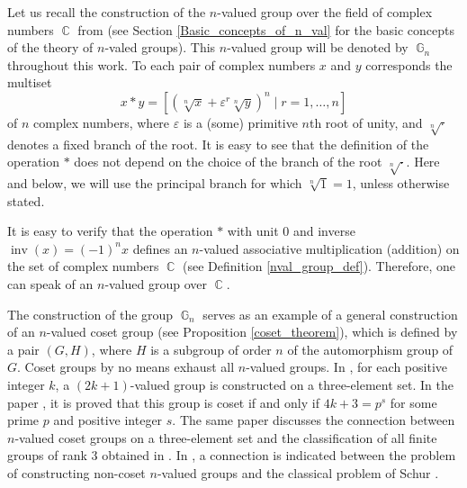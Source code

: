 \documentclass[14pt, dvipsnames]{extarticle}
\theoremstyle{definition}
\theoremstyle{definition}
\theoremstyle{remark}
\DeclareMathOperator{\G}{\mathbb{G}}
\DeclareMathOperator{\inv}{\mathrm{inv}}
\DeclareMathOperator{\Cc}{\mathbb{C}}
\renewcommand{\epsilon}{\varepsilon}
\begin{document}
Let us recall the construction of the $n$-valued group over the field of complex numbers $\Cc$ from \cite{Buchstaber_Novikov} (see Section \ref{Basic_concepts_of_n_val} for the basic concepts of the theory of $n$-valed groups). This $n$-valued group will be denoted by $\G_n$ throughout this work. To each pair of complex numbers $x$ and $y$ corresponds the multiset
\begin{equation}\label{operation}
x\ast y = [(\sqrt[n]{x} + \epsilon^r\sqrt[n]{y})^n\mid r = 1, \dots, n]
\end{equation}
of $n$ complex numbers, where $\epsilon$ is a (some) primitive $n$th root of unity, and $\sqrt[n]{\cdot}$ denotes a fixed branch of the root. It is easy to see that the definition of the operation $\ast$ does not depend on the choice of the branch of the root $\sqrt[n]{\cdot}$. Here and below, we will use the principal branch for which $\sqrt[n]{1} = 1$, unless otherwise stated.

It is easy to verify that the operation $\ast$ with unit $0$ and inverse $\inv(x) = (-1)^nx$ defines an $n$-valued associative multiplication (addition) on the set of complex numbers $\Cc$ (see Definition \ref{nval_group_def}). Therefore, one can speak of an $n$-valued group over $\Cc$.

The construction of the group $\G_n$ serves as an example of a general construction of an $n$-valued coset group (see Proposition \ref{coset_theorem}), which is defined by a pair $(G, H)$, where $H$ is a subgroup of order $n$ of the automorphism group of $G$. Coset groups by no means exhaust all $n$-valued groups. In \cite{Buchstaber}, for each positive integer $k$, a $(2k + 1)$-valued group is constructed on a three-element set. In the paper \cite{Ponomarenko24}, it is proved that this group is coset if and only if $4k + 3 = p^s$ for some prime $p$ and positive integer $s$. The same paper discusses the connection between $n$-valued coset groups on a three-element set and the classification of all finite groups of rank 3 obtained in \cite{Liebeck}. In \cite{Vershik}, a connection is indicated between the problem of constructing non-coset $n$-valued groups and the classical problem of Schur \cite{Wielandt}.
\end{document}
